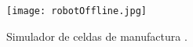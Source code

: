 \begin{itemize}
\begin{figure}[!ht]
	\centering
		\texttt{[image: robotOffline.jpg]}
	\caption[Programación fuera de línea.]{Simulador de celdas de manufactura \citep{robotOffline}.}
	\label{fig:robotOffline}
\end{figure}

%
%
%
%


\end{itemize}

